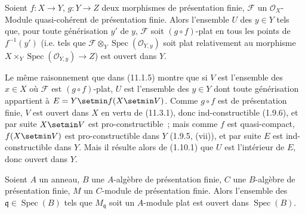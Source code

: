 
\begin{corollary}[11.3.2]
\label{IV.11.3.2-fr}
Soient $f:X\to Y$, $g:Y\to Z$ deux morphismes de présentation finie,
$\mathcal F$ un $\mathcal O_X$-Module quasi-cohérent de présentation finie.
Alors l'ensemble $U$ des $y\in Y$ tels que, pour toute générisation $y'$ de
$y$, $\mathcal F$ soit $(g\circ f)$-plat en tous les points de $f^{-1}(y')$
\textup{(i.e.} tels que $\mathcal F\otimes_Y\operatorname{Spec}(\mathcal O_{Y,y})$
soit plat relativement au morphisme
$X\times_Y\operatorname{Spec}(\mathcal O_{Y,y})\to Z$\textup{)} est ouvert dans $Y$.
\end{corollary}

Le même raisonnement que dans (11.1.5) montre que si $V$ est l'ensemble des
$x\in X$ où $\mathcal F$ est $(g\circ f)$-plat, $U$ est l'ensemble des $y\in Y$
dont toute générisation appartient à $E=Y\setmin f(X\setmin V)$. Comme $g\circ f$ est de
présentation finie, $V$ est ouvert dans $X$ en vertu de (11.3.1), donc
ind-constructible (1.9.6), et par suite $X\setmin V$ est pro-constructible~; mais comme
$f$ est quasi-compact, $f(X\setmin V)$ est pro-constructible dans $Y$ (1.9.5, (vii)),
et par suite $E$ est ind-constructible dans $Y$. Mais il résulte alors de
(1.10.1) que $U$ est l'intérieur de $E$, donc ouvert dans $Y$.

\begin{corollary}[11.3.3]
\label{IV.11.3.3-fr}
Soient $A$ un anneau, $B$ une $A$-algèbre de présentation finie, $C$ une
$B$-algèbre de présentation finie, $M$ un $C$-module de présentation finie.
Alors l'ensemble des $\mathfrak q\in\operatorname{Spec}(B)$ tels que
$M_\mathfrak q$ soit un $A$-module plat est ouvert dans
$\operatorname{Spec}(B)$.
\end{corollary}

